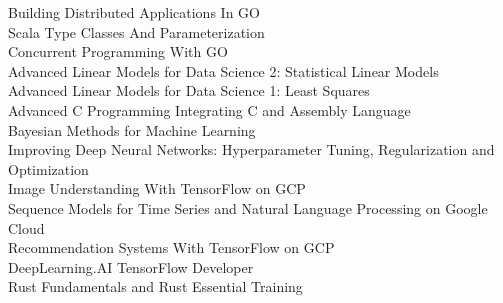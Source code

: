 \documentclass{myresume}
\begin{document}
        {Building Distributed Applications In GO} \\
        {Scala Type Classes And Parameterization} \\
        {Concurrent Programming With GO} \\
        {Advanced Linear Models for Data Science 2: Statistical Linear Models} \\
        {Advanced Linear Models for Data Science 1: Least Squares} \\
        {Advanced C Programming Integrating C and Assembly Language} \\
        {Bayesian Methods for Machine Learning} \\
        {Improving Deep Neural Networks: Hyperparameter Tuning, Regularization and Optimization} \\
        {Image Understanding With TensorFlow on GCP} \\
        {Sequence Models for Time Series and Natural Language Processing on Google Cloud} \\
        {Recommendation Systems With TensorFlow on GCP} \\
        {DeepLearning.AI TensorFlow Developer} \\
        {Rust Fundamentals and Rust Essential Training} \\
    
\end{document}
